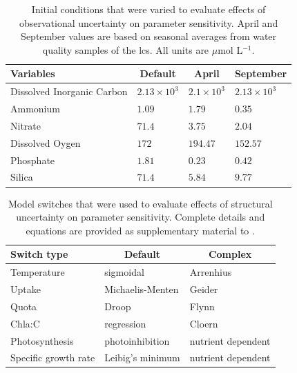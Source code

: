 \documentclass[letterpaper,12pt,oneside]{article}\usepackage[]{graphicx}\usepackage[]{color}
\begin{document}
\begin{table}[!tbp]
\caption{Initial conditions that were varied to evaluate effects of observational uncertainty on parameter sensitivity.  April and September values are based on seasonal averages from water quality samples of the \ac{lcs}.  All units are $\mu$mol L$^{-1}$.\label{tab:inits}} 
\begin{center}
\begin{tabular}{llll}
\hline\hline
\multicolumn{1}{l}{Variables}&\multicolumn{1}{c}{Default}&\multicolumn{1}{c}{April}&\multicolumn{1}{c}{September}\tabularnewline
\hline
Dissolved Inorganic Carbon&$2.13\times 10^{3}$&$2.1\times 10^{3}$&$2.13\times 10^{3}$\tabularnewline
Ammonium&$1.09$&$1.79$&$0.35$\tabularnewline
Nitrate&$71.4$&$3.75$&$2.04$\tabularnewline
Dissolved Oygen&$172$&$194.47$&$152.57$\tabularnewline
Phosphate&$1.81$&$0.23$&$0.42$\tabularnewline
Silica&$71.4$&$5.84$&$9.77$\tabularnewline
\hline
\end{tabular}\end{center}

\end{table}


\begin{table}[!tbp]
\caption{Model switches that were used to evaluate effects of structural uncertainty on parameter sensitivity. Complete details and equations are provided as supplementary material to .\label{tab:strcs}} 
\begin{center}
\begin{tabular}{lll}
\hline\hline
\multicolumn{1}{l}{Switch type}&\multicolumn{1}{c}{Default}&\multicolumn{1}{c}{Complex}\tabularnewline
\hline
Temperature&sigmoidal {\scriptsize \citep{Eldridge10}}&Arrenhius {\scriptsize \citep{Geider97}}\tabularnewline
Uptake&Michaelis-Menten {\scriptsize \citep{Dugdale67}}&Geider {\scriptsize \citep{Lehman75,Geider98}}\tabularnewline
Quota&Droop {\scriptsize \citep{Droop73}}&Flynn {\scriptsize \citep{Flynn03}}\tabularnewline
Chla:C&regression {\scriptsize \citep{Murrell14}}&Cloern {\scriptsize \citep{Cloern95}}\tabularnewline
Photosynthesis&photoinhibition {\scriptsize \citep{Platt80}}&nutrient dependent\tabularnewline
Specific growth rate&Leibig's minimum&nutrient dependent\tabularnewline
\hline
\end{tabular}\end{center}

\end{table}
\end{document}
